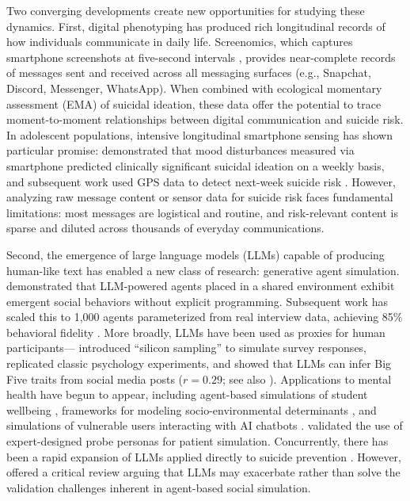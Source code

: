 \documentclass[review,12pt,authoryear]{elsarticle}
\begin{document}
Two converging developments create new opportunities for studying these dynamics. First, digital phenotyping has produced rich longitudinal records of how individuals communicate in daily life. Screenomics, which captures smartphone screenshots at five-second intervals \citep{reeves2021screenomics}, provides near-complete records of messages sent and received across all messaging surfaces (e.g., Snapchat, Discord, Messenger, WhatsApp). When combined with ecological momentary assessment (EMA) of suicidal ideation, these data offer the potential to trace moment-to-moment relationships between digital communication and suicide risk. In adolescent populations, intensive longitudinal smartphone sensing has shown particular promise: \citet{auerbach2023intensive} demonstrated that mood disturbances measured via smartphone predicted clinically significant suicidal ideation on a weekly basis, and subsequent work used GPS data to detect next-week suicide risk \citep{auerbach2025gps}. However, analyzing raw message content or sensor data for suicide risk faces fundamental limitations: most messages are logistical and routine, and risk-relevant content is sparse and diluted across thousands of everyday communications.

Second, the emergence of large language models (LLMs) capable of producing human-like text has enabled a new class of research: generative agent simulation. \citet{park2023generative} demonstrated that LLM-powered agents placed in a shared environment exhibit emergent social behaviors without explicit programming. Subsequent work has scaled this to 1,000 agents parameterized from real interview data, achieving 85\% behavioral fidelity \citep{park2024generative}. More broadly, LLMs have been used as proxies for human participants---\citet{argyle2023silicon} introduced ``silicon sampling'' to simulate survey responses, \citet{aher2023turing} replicated classic psychology experiments, and \citet{peters2024llm} showed that LLMs can infer Big Five traits from social media posts ($r = 0.29$; see also \citealt{brickman2025llm}). Applications to mental health have begun to appear, including agent-based simulations of student wellbeing \citep{zhao2025studentlife}, frameworks for modeling socio-environmental determinants \citep{kambeitz2025modelling}, and simulations of vulnerable users interacting with AI chatbots \citep{qiu2025emoagent}. \citet{louie2024roleplay} validated the use of expert-designed probe personas for patient simulation. Concurrently, there has been a rapid expansion of LLMs applied directly to suicide prevention \citep{holmes2025scoping}. However, \citet{tornberg2025validation} offered a critical review arguing that LLMs may exacerbate rather than solve the validation challenges inherent in agent-based social simulation.
\end{document}
